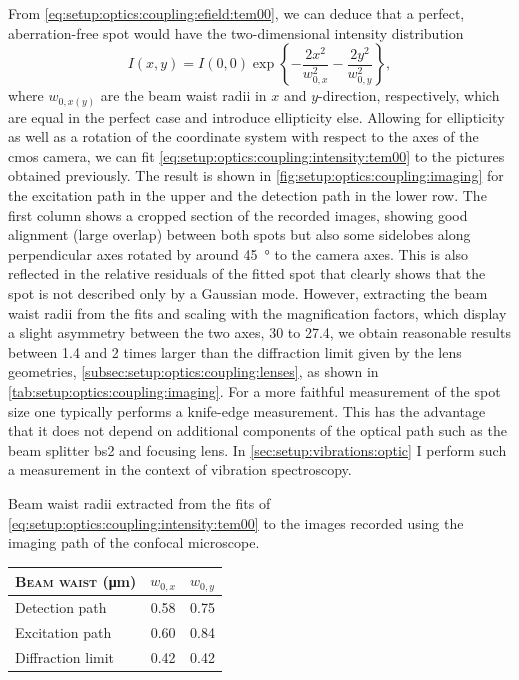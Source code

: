 From \cref{eq:setup:optics:coupling:efield:tem00}, we can deduce that a perfect, aberration-free spot would have the two-dimensional intensity distribution
\begin{equation}\label{eq:setup:optics:coupling:intensity:tem00}
    I(x, y) = I(0, 0) \exp\left\lbrace -\frac{2 x^2}{w_{0,x}^2} -\frac{2 y^2}{w_{0,y}^2} \right\rbrace,
\end{equation}
where $w_{0,x(y)}$ are the beam waist radii in $x$ and $y$-direction, respectively, which are equal in the perfect case and introduce ellipticity else.
Allowing for ellipticity as well as a rotation of the coordinate system with respect to the axes of the \acrshort{cmos} camera, we can fit \cref{eq:setup:optics:coupling:intensity:tem00} to the pictures obtained previously.
The result is shown in \cref{fig:setup:optics:coupling:imaging} for the excitation path in the upper and the detection path in the lower row.
The first column shows a cropped section of the recorded images, showing good alignment (large overlap) between both spots but also some sidelobes along perpendicular axes rotated by around \qty{45}{\degree} to the camera axes.
This is also reflected in the relative residuals of the fitted spot that clearly shows that the spot is not described only by a Gaussian  mode.
However, extracting the beam waist radii from the fits and scaling with the magnification factors, which display a slight asymmetry between the two axes, \num{30} to \num{27.4}, we obtain reasonable results between \num{1.4} and \num{2} times larger than the diffraction limit given by the lens geometries, \cf \cref{subsec:setup:optics:coupling:lenses}, as shown in \cref{tab:setup:optics:coupling:imaging}.
For a more faithful measurement of the spot size one typically performs a knife-edge measurement.
This has the advantage that it does not depend on additional components of the optical path such as the beam splitter \acrshort{bs}2 and focusing lens.
In \cref{sec:setup:vibrations:optic} I perform such a measurement in the context of vibration spectroscopy.

\begin{margintable}[*-5]
    \centering
    \footnotesize
    \caption{
        Beam waist radii extracted from the fits of \cref{eq:setup:optics:coupling:intensity:tem00} to the images recorded using the imaging path of the confocal microscope.
    }
    \label{tab:setup:optics:coupling:imaging}
    \begin{tabular}{lSS}
        \toprule
        \textsc{Beam waist} (\unit{\micro\meter})    & $w_{0, x}$ & $w_{0, y}$ \\
        \midrule
        Detection path                               & 0.58       & 0.75 \\
        Excitation path                              & 0.60       & 0.84 \\
        Diffraction limit                            & 0.42       & 0.42 \\
        \bottomrule
    \end{tabular}
\end{margintable}

